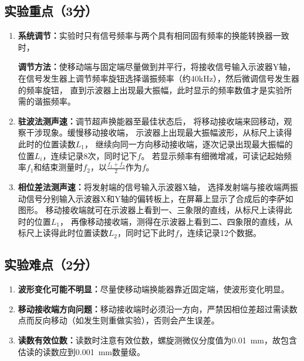 \documentclass{../template/Report}
\begin{document}
\subsection{实验重点（3分）}
\begin{enumerate}
	\item \textbf{系统调节：}实验时只有信号频率与两个具有相同固有频率的换能转换器一致时，

	      \textbf{调节方法：}使移动端与固定端尽量做到并平行，将接收信号输入示波器Y轴，
	      在信号发生器上调节频率旋钮选择谐振频率（约40\si{\kilo\hertz}），然后微调信号发生器的频率旋钮，
	      直到示波器上出现最大振幅，此时显示的频率数值才是实验所需的谐振频率。

	\item \textbf{驻波法测声速：}调节超声换能器至最佳状态后，
	      将移动接收端来回移动，观察干涉现象。缓慢移动接收端，
	      示波器上出现最大振幅波形，从标尺上读得此时的位置读数$L_1$，
	      继续向同一方向移动接收端，逐次记录出现最大振幅的位置$L_i$，连续记录8次，同时记下$f$。
	      若显示频率有细微增减，可读记起始频率$f_1$和结束测量时$f_2$，以$\frac{f_1+f_2}{2}$作为$f$。

	\item \textbf{相位差法测声速：}将发射端的信号输入示波器X轴，
	      选择发射端与接收端两振动信号分别输入示波器X和Y轴的偏转板上，在屏幕上显示了合成后的李萨如图形。
	      移动接收端就可在示波器上看到一、三象限的直线，从标尺上读得此时的位置$L_1$，
	      再像移动接收端，测得在示波器上看到二、四象限的直线，从标尺上读得此时位置读数$L_2$，同时记下此时$f$，连续记录12个数据。
\end{enumerate}
\subsection{实验难点（2分）}
\begin{enumerate}
	\item \textbf{波形变化可能不明显：}尽量使移动端换能器靠近固定端，使波形变化明显。
	\item \textbf{移动接收端方向问题：}移动接收端时必须沿一方向，严禁因相位差超过需读数点而反向移动（如发生则重做实验），否则会产生误差。
	\item \textbf{读数有效位数：}读数时注意有效位数，螺旋测微仪分度值为\SI{0.01}{\mm}，故包含估读的读数应到\SI{0.001}{\mm}数量级。
\end{enumerate}
\end{document}
